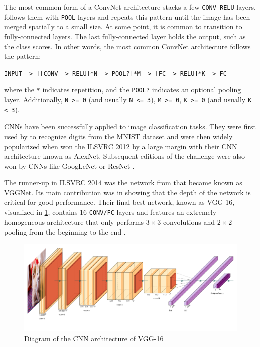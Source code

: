 The most common form of a ConvNet architecture stacks a few \texttt{CONV-RELU} layers, follows them with \texttt{POOL} layers and repeats this pattern until the image has been merged spatially to a small size. At some point, it is common to transition to fully-connected layers. The last fully-connected layer holds the output, such as the class scores. In other words, the most common ConvNet architecture follows the pattern:

\texttt{INPUT -> [[CONV -> RELU]*N -> POOL?]*M -> [FC -> RELU]*K -> FC}

where the \texttt{*} indicates repetition, and the \texttt{POOL?} indicates an optional pooling layer. Additionally, \texttt{N >= 0} (and usually \texttt{N <= 3}), \texttt{M >= 0}, \texttt{K >= 0} (and usually \texttt{K < 3}). 

\acp{CNN} have been successfully applied to image classification tasks. They were first used by \cite{LeCun:1989} to recognize digits from the MNIST dataset and were then widely popularized when \cite{krizhevsky2012imagenet} won the \ac{ILSVRC} 2012 by a large margin with their \ac{CNN} architecture known as AlexNet. Subsequent editions of the challenge were also won by \acp{CNN} like GoogLeNet \parencite{szegedy2015going} or ResNet \parencite{he2016deep}. 

The runner-up in \ac{ILSVRC} 2014 was the network from \cite{simonyan2014very} that became known as VGGNet. Its main contribution was in showing that the depth of the network is critical for good performance. Their final best network, known as VGG-16, visualized in \ref{fig:vgg}, contains 16 \texttt{CONV/FC} layers and features an extremely homogeneous architecture that only performs $3\times3$ convolutions and $2\times2$ pooling from the beginning to the end \parencite{stanford2020cs231n}. 
\begin{figure}[H]
	\centering
	\includegraphics[width=\textwidth]{images/vgg16}
	\caption{Diagram of the  \ac{CNN} architecture of VGG-16}
	\label{fig:vgg}
\end{figure}


